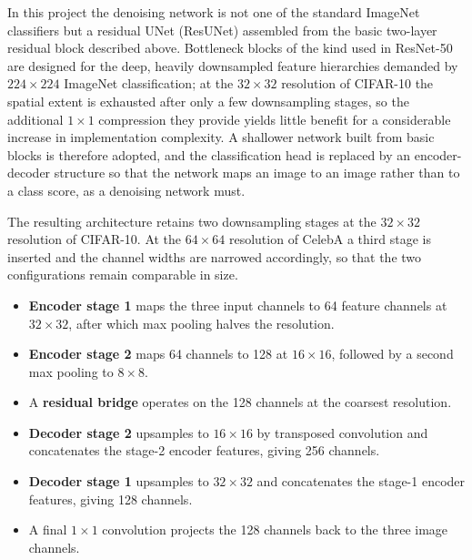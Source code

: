 In this project the denoising network is not one of the standard ImageNet classifiers but a residual
UNet (ResUNet) assembled from the basic two-layer residual block described above. Bottleneck blocks
of the kind used in ResNet-50 are designed for the deep, heavily downsampled feature hierarchies
demanded by $224 \times 224$ ImageNet classification; at the $32 \times 32$ resolution of CIFAR-10
the spatial extent is exhausted after only a few downsampling stages, so the additional $1 \times 1$
compression they provide yields little benefit for a considerable increase in implementation
complexity. A shallower network built from basic blocks is therefore adopted, and the classification
head is replaced by an encoder-decoder structure so that the network maps an image to an image
rather than to a class score, as a denoising network must.

The resulting architecture retains two downsampling stages at the $32 \times 32$ resolution of
CIFAR-10. At the $64 \times 64$ resolution of CelebA a third stage is inserted and the channel
widths are narrowed accordingly, so that the two configurations remain comparable in size.

\begin{itemize}
    \item \textbf{Encoder stage 1} maps the three input channels to 64 feature channels at $32 \times 32$, after which max pooling halves the resolution.
    \item \textbf{Encoder stage 2} maps 64 channels to 128 at $16 \times 16$, followed by a second max pooling to $8 \times 8$.
    \item A \textbf{residual bridge} operates on the 128 channels at the coarsest resolution.
    \item \textbf{Decoder stage 2} upsamples to $16 \times 16$ by transposed convolution and concatenates the stage-2 encoder features, giving 256 channels.
    \item \textbf{Decoder stage 1} upsamples to $32 \times 32$ and concatenates the stage-1 encoder features, giving 128 channels.
    \item A final $1 \times 1$ convolution projects the 128 channels back to the three image channels.
\end{itemize}

